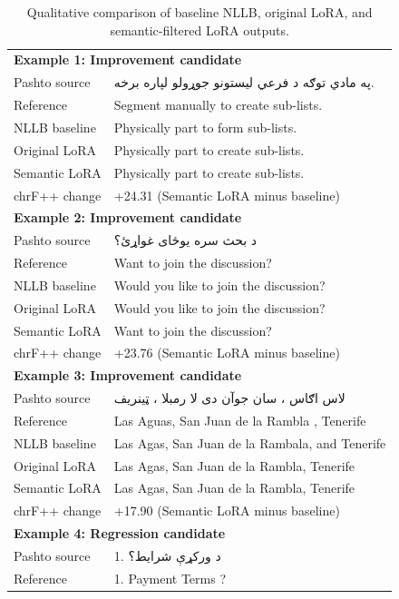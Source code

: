 \begin{table}[t]
\centering
\caption{Qualitative comparison of baseline NLLB, original LoRA, and semantic-filtered LoRA outputs.}
\label{tab:qualitative-comparison}
\footnotesize
\begin{tabularx}{\textwidth}{p{}X}
\toprule
\multicolumn{2}{l}{\textbf{Example 1: Improvement candidate}} \\
Pashto source & په مادي توګه د فرعي لیستونو جوړولو لپاره برخه. \\
Reference & Segment manually to create sub-lists. \\
NLLB baseline & Physically part to form sub-lists. \\
Original LoRA & Physically part to create sub-lists. \\
Semantic LoRA & Physically part to create sub-lists. \\
chrF++ change & +24.31 (Semantic LoRA minus baseline) \\
\midrule
\multicolumn{2}{l}{\textbf{Example 2: Improvement candidate}} \\
Pashto source & د بحث سره یوځای غواړئ؟ \\
Reference & Want to join the discussion? \\
NLLB baseline & Would you like to join the discussion? \\
Original LoRA & Would you like to join the discussion? \\
Semantic LoRA & Want to join the discussion? \\
chrF++ change & +23.76 (Semantic LoRA minus baseline) \\
\midrule
\multicolumn{2}{l}{\textbf{Example 3: Improvement candidate}} \\
Pashto source & لاس اګاس ، سان جوآن دی لا رمبلا ، ټینریف \\
Reference & Las Aguas, San Juan de la Rambla , Tenerife \\
NLLB baseline & Las Agas, San Juan de la Rambala, and Tenerife \\
Original LoRA & Las Agas, San Juan de la Rambla, Tenerife \\
Semantic LoRA & Las Agas, San Juan de la Rambla, Tenerife \\
chrF++ change & +17.90 (Semantic LoRA minus baseline) \\
\midrule
\multicolumn{2}{l}{\textbf{Example 4: Regression candidate}} \\
Pashto source & 1. د ورکړې شرایط؟ \\
Reference & 1. Payment Terms ? \\

\end{tabularx}
\end{table}
